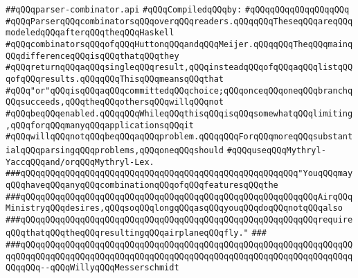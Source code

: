 \label{src/lib/src/parser-combinator.api}
\verb|##qQQqparser-combinator.api|\newline
\newline
\verb|#qQQqCompiledqQQqby:|\newline
\verb|#qQQqqQQqqQQqqQQqqQQq|\newline
\newline
\newline
\newline
\verb|#qQQqParserqQQqcombinatorsqQQqoverqQQqreaders.qQQqqQQqTheseqQQqareqQQqmodeledqQQqafterqQQqtheqQQqHaskell|\newline
\verb|#qQQqcombinatorsqQQqofqQQqHuttonqQQqandqQQqMeijer.qQQqqQQqTheqQQqmainqQQqdifferenceqQQqisqQQqthatqQQqthey|\newline
\verb|#qQQqreturnqQQqaqQQqsingleqQQqresult,qQQqinsteadqQQqofqQQqaqQQqlistqQQqofqQQqresults.qQQqqQQqThisqQQqmeansqQQqthat|\newline
\verb|#qQQq"or"qQQqisqQQqaqQQqcommittedqQQqchoice;qQQqonceqQQqoneqQQqbranchqQQqsucceeds,qQQqtheqQQqothersqQQqwillqQQqnot|\newline
\verb|#qQQqbeqQQqenabled.qQQqqQQqWhileqQQqthisqQQqisqQQqsomewhatqQQqlimiting,qQQqforqQQqmanyqQQqapplicationsqQQqit|\newline
\verb|#qQQqwillqQQqnotqQQqbeqQQqaqQQqproblem.qQQqqQQqForqQQqmoreqQQqsubstantialqQQqparsingqQQqproblems,qQQqoneqQQqshould|\newline
\verb|#qQQquseqQQqMythryl-YaccqQQqand/orqQQqMythryl-Lex.|\newline
\newline
\newline
\verb|###qQQqqQQqqQQqqQQqqQQqqQQqqQQqqQQqqQQqqQQqqQQqqQQqqQQqqQQq"YouqQQqmayqQQqhaveqQQqanyqQQqcombinationqQQqofqQQqfeaturesqQQqthe|\newline
\verb|###qQQqqQQqqQQqqQQqqQQqqQQqqQQqqQQqqQQqqQQqqQQqqQQqqQQqqQQqqQQqAirqQQqMinistryqQQqdesires,qQQqsoqQQqlongqQQqasqQQqyouqQQqdoqQQqnotqQQqalso|\newline
\verb|###qQQqqQQqqQQqqQQqqQQqqQQqqQQqqQQqqQQqqQQqqQQqqQQqqQQqqQQqqQQqrequireqQQqthatqQQqtheqQQqresultingqQQqairplaneqQQqfly."|\newline
\verb|###|\newline
\verb|###qQQqqQQqqQQqqQQqqQQqqQQqqQQqqQQqqQQqqQQqqQQqqQQqqQQqqQQqqQQqqQQqqQQqqQQqqQQqqQQqqQQqqQQqqQQqqQQqqQQqqQQqqQQqqQQqqQQqqQQqqQQqqQQqqQQqqQQqqQQqqQQq--qQQqWillyqQQqMesserschmidt|\newline
\newline
